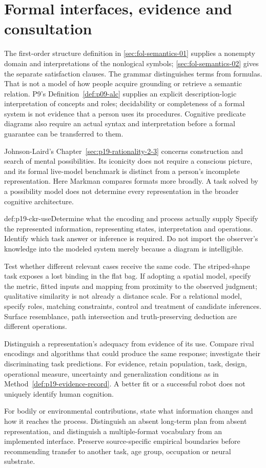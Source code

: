 \section{Formal interfaces, evidence and consultation}
\label{sec:p19-ckr-consultation}

The first-order structure definition in \cref{sec:fol-semantics-01}
supplies a nonempty domain and interpretations of the nonlogical symbols;
\cref{sec:fol-semantics-02} gives the separate satisfaction clauses.
The grammar distinguishes terms from formulas.
That is not a model of how people acquire grounding or retrieve
a semantic relation. P9's Definition~\ref{def:p09-alc} supplies
an explicit description-logic interpretation of concepts and roles;
decidability or completeness of a formal system is not evidence
that a person uses its procedures. Cognitive predicate diagrams
also require an actual syntax and interpretation before a formal
guarantee can be transferred to them.

Johnson-Laird's Chapter~\ref{sec:p19-rationality-2-3} concerns
construction and search of mental possibilities. Its iconicity
does not require a conscious picture, and its formal live-model
benchmark is distinct from a person's incomplete representation.
Here Markman compares formats more broadly. A task solved by
a possibility model does not determine every representation in
the broader cognitive architecture.

\begin{hbmethod}{def:p19-ckr-use}{Determine what the encoding and process actually supply}
Specify the represented information, representing states,
interpretation and operations. Identify which task answer or
inference is required. Do not import the observer's knowledge
into the modeled system merely because a diagram is intelligible.

Test whether different relevant cases receive the same code.
The striped-shape task exposes a lost binding in the flat bag.
If adopting a spatial model, specify the metric, fitted inputs
and mapping from proximity to the observed judgment; qualitative
similarity is not already a distance scale. For a relational
model, specify roles, matching constraints, control and treatment
of candidate inferences. Surface resemblance, path intersection
and truth-preserving deduction are different operations.

Distinguish a representation's adequacy from evidence of its use.
Compare rival encodings and algorithms that could produce the
same response; investigate their discriminating task predictions.
For evidence, retain population, task, design, operational measure,
uncertainty and generalization conditions as in
Method~\ref{def:p19-evidence-record}. A better fit or a successful
robot does not uniquely identify human cognition.

For bodily or environmental contributions, state what information
changes and how it reaches the process. Distinguish an absent
long-term plan from absent representation, and distinguish a
multiple-format vocabulary from an implemented interface. Preserve
source-specific empirical boundaries before recommending transfer
to another task, age group, occupation or neural substrate.
\end{hbmethod}

